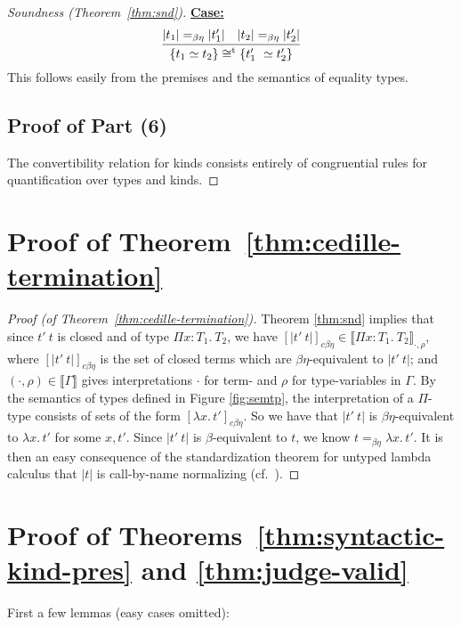 \documentclass{article}
\newcommand{\interp}[1]{\llbracket #1 \rrbracket}
\newcommand{\startcase}[1]{\vspace{#1} \noindent\textbf{\underline{Case:}}}
\begin{document}
\begin{proof}[Soundness (Theorem~\ref{thm:snd})]
\startcase{.2cm}
\[
    \infer{\{ t_1 \simeq t_2 \} \cong^{\text{t}} \{ t_1'\ \simeq t_2' \}}{|t_1| =_{\beta\eta} |t_1'| & |t_2| =_{\beta\eta} |t_2'|}
\]
This follows easily from the premises and the semantics of equality types.

\subsection*{Proof of Part (6)}

The convertibility relation for kinds consists entirely of congruential rules
for quantification over types and kinds.

\end{proof}



\section{Proof of Theorem~\ref{thm:cedille-termination}}
\begin{proof}[Proof (of Theorem~\ref{thm:cedille-termination})]
Theorem \ref{thm:snd} implies that since
$t'\ t$ is closed and of type $\Pi x:T_1.\ T_2$, we have
$[|t'\ t|]_{c\beta\eta}\in \interp{\Pi x:T_1.\ T_2}_{\cdot,\rho}$,
where $[|t'\ t|]_{c\beta\eta}$ is the set of closed terms which are
$\beta\eta$-equivalent to $|t'\ t|$; and
$(\cdot,\rho)\in\interp{\Gamma}$ gives interpretations $\cdot$ for
term- and $\rho$ for type-variables in $\Gamma$.  By the semantics of
types defined in Figure \ref{fig:semtp}, the
interpretation of a $\Pi$-type consists of sets of the form
$[\lambda x.\,t']_{c\beta\eta}$.  So we have that $|t'\ t|$ is $\beta\eta$-equivalent to
$\lambda x.\, t'$ for some $x, t'$.  
Since $|t'\ t|$ is $\beta$-equivalent to $t$, we know $t =_{\beta\eta} \lambda x.\, t'$.
It is then an easy consequence of the
standardization theorem for untyped lambda calculus that $|t|$ is
call-by-name normalizing (cf.~\cite{Kashima2000}).
\end{proof}

\section{Proof of Theorems~\ref{thm:syntactic-kind-pres} and \ref{thm:judge-valid}}
\label{sec:proof-syntactic-kind-pres}

First a few lemmas (easy cases omitted):
\end{document}
